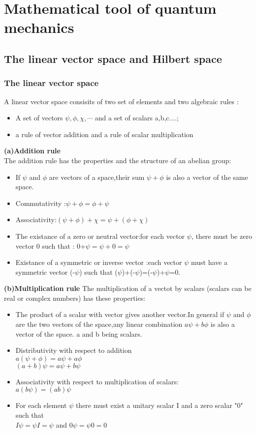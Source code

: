 \chapter{Mathematical tool of quantum mechanics}
\section{The linear vector space and Hilbert space}
\subsection{The linear vector space}
A linear vector space consisits of two set of elements and two algebraic rules :
\begin{itemize}
	\item A set of vectors $\psi,\phi,\chi, \cdots $ and a set of scalars a,b,c....;
	\item a rule of vector addition and a rule of scalar multiplication
\end{itemize}
\textbf{(a)Addition rule}\\
The addition rule has the properties and the structure of an abelian group:
\begin{itemize}
	\item If $\psi$ and $\phi$ are vectors of a space,their sum $\psi+\phi$ is also a vector of the same space.
	\item Commutativity :$\psi+\phi=\phi+\psi$
	\item Associativity:$(\psi+\phi)+\chi=\psi+(\phi+\chi)$
	\item The existance of a zero or neutral vector:for each vector $\psi$, there must be zero vector 0 such that : 0+$\psi=\psi+0=\psi$
	\item Existance of a symmetric or inverse vector :each vector $\psi$ must have a symmetric vector (-$\psi$) such that ($\psi$)+(-$\psi$)=(-$\psi$)+$\psi$=0.
\end{itemize}
\textbf{(b)Multiplication rule}
The multiplication of a vectot by scalars (scalars can be real or complex numbers) has these properties:
\begin{itemize}
	\item The product of a scalar with vector gives another vector.In general if $\psi$ and $\phi$ are the two vectors of the space,any linear combination $a\psi+b\phi$ is also a vector of the space. a and b being scalars.
	\item Distributivity with respect to addition\\
	$a(\psi+\phi)=a\psi+a\phi$\\
	$(a+b)\psi=a\psi+b\psi$
	\item Associativity with respect to multiplication of scalars:\\
	$a(b\psi)=(ab)\psi$
	\item For each element $\psi$ there must exist a unitary scalar I and a zero scalar "0" such that \\
	$I\psi=\psi I =\psi$ and $0\psi=\psi0=0$
\end{itemize}
